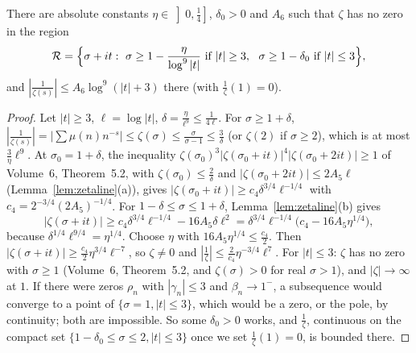 \begin{lemma}\label{lem:invzeta}
There are absolute constants $\eta\in\left]0,\frac14\right]$, $\delta_0>0$ and $A_6$ such that $\zeta$ has no zero in the region
\[
\mathcal R=\Bigl\{\sigma+it:\ \sigma\ge1-\frac\eta{\log^9|t|}\text{ if }|t|\ge3,\ \ \sigma\ge1-\delta_0\text{ if }|t|\le3\Bigr\},
\]
and $|\frac1{\zeta(s)}|\le A_6\log^9(|t|+3)$ there (with $\frac1\zeta(1)=0$).
\end{lemma}
\begin{proof}
Let $|t|\ge3$, $\ell=\log|t|$, $\delta=\frac\eta{\ell^9}\le\frac1{4\ell}$. For $\sigma\ge1+\delta$, $|\frac1{\zeta(s)}|=|\sum\mu(n)n^{-s}|\le\zeta(\sigma)\le\frac\sigma{\sigma-1}\le\frac3\delta$ (or $\zeta(2)$ if $\sigma\ge2$), which is at most $\frac3\eta\ell^9$.
At $\sigma_0=1+\delta$, the inequality $\zeta(\sigma_0)^3|\zeta(\sigma_0+it)|^4|\zeta(\sigma_0+2it)|\ge1$ of Volume~6, Theorem~5.2, with $\zeta(\sigma_0)\le\frac2\delta$ and $|\zeta(\sigma_0+2it)|\le2A_5\ell$ (Lemma~\ref{lem:zetaline}(a)), gives $|\zeta(\sigma_0+it)|\ge c_4\delta^{3/4}\ell^{-1/4}$ with $c_4=2^{-3/4}(2A_5)^{-1/4}$. For $1-\delta\le\sigma\le1+\delta$, Lemma~\ref{lem:zetaline}(b) gives
\[
|\zeta(\sigma+it)|\ge c_4\delta^{3/4}\ell^{-1/4}-16A_5\delta\ell^2=\delta^{3/4}\ell^{-1/4}\bigl(c_4-16A_5\eta^{1/4}\bigr),
\]
because $\delta^{1/4}\ell^{9/4}=\eta^{1/4}$. Choose $\eta$ with $16A_5\eta^{1/4}\le\frac{c_4}2$. Then $|\zeta(\sigma+it)|\ge\frac{c_4}2\eta^{3/4}\ell^{-7}$, so $\zeta\ne0$ and $|\frac1\zeta|\le\frac2{c_4}\eta^{-3/4}\ell^7$.
For $|t|\le3$: $\zeta$ has no zero with $\sigma\ge1$ (Volume~6, Theorem~5.2, and $\zeta(\sigma)>0$ for real $\sigma>1$), and $|\zeta|\to\infty$ at $1$. If there were zeros $\rho_n$ with $|\gamma_n|\le3$ and $\beta_n\to1^-$, a subsequence would converge to a point of $\{\sigma=1,|t|\le3\}$, which would be a zero, or the pole, by continuity; both are impossible. So some $\delta_0>0$ works, and $\frac1\zeta$, continuous on the compact set $\{1-\delta_0\le\sigma\le2,|t|\le3\}$ once we set $\frac1\zeta(1)=0$, is bounded there.
\end{proof}


